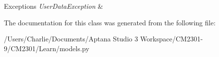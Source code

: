 \begin{DoxyExceptions}{Exceptions}
{\em User\-Data\-Exception} & \\
\hline
\end{DoxyExceptions}


The documentation for this class was generated from the following file\-:\begin{DoxyCompactItemize}
\item 
/\-Users/\-Charlie/\-Documents/\-Aptana Studio 3 Workspace/\-C\-M2301-\/9/\-C\-M2301/\-Learn/models.\-py\end{DoxyCompactItemize}
